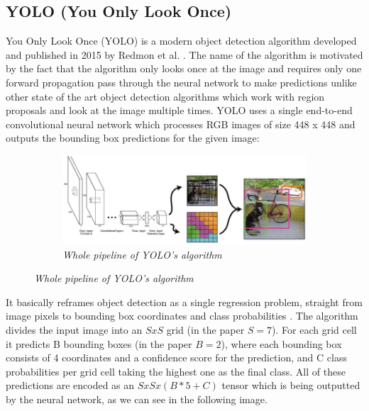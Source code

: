 \subsection{YOLO (You Only Look Once)}
You Only Look Once (YOLO) is a modern object detection algorithm developed and
published in 2015 by Redmon et al. \cite{yolo_1}. The name of the algorithm is
motivated by the fact that the algorithm only looks once at the image and
requires only one forward propagation pass through the neural network to make
predictions unlike other state of the art object detection algorithms which
work with region proposals and look at the image multiple times. YOLO uses a
single end-to-end convolutional neural network which processes RGB images of
size 448 x 448 and outputs the bounding box predictions for the given image:

\begin{figure}[H]
    \centering
    \begin{subfigure}[b]{0.8\textwidth}
        \centering
        \includegraphics[width=\textwidth]{Figures/2. Related Work/yolo_1.png}
        \caption{\textit{Whole pipeline of YOLO's algorithm} \cite{yolo_images}}
    \end{subfigure}
\end{figure}

It basically reframes object detection as a single regression problem, straight
from image pixels to bounding box coordinates and class probabilities
\cite{yolo_2}. The algorithm divides the input image into an $S x S$ grid
(in the paper $S = 7$). For each grid cell it predicts B bounding boxes
(in the paper $B = 2$), where each bounding box consists of 4 coordinates and a
confidence score for the prediction, and C class probabilities per grid cell
taking the highest one as the final class. All of these predictions are encoded
as an $S x S x (B * 5 + C)$ tensor which is being outputted by the neural
network, as we can see in the following image.

